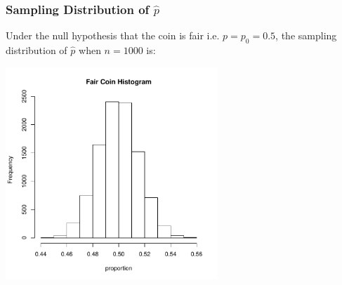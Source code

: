 \documentclass[handout]{beamer}
\newcommand{\blue}[1]{\textcolor{blue2}{#1}}
\begin{document}
\begin{frame}
\frametitle{Sampling Distribution of $\widehat{p}$}
\blue{Under the null hypothesis that the coin is fair} i.e. $p=p_0=0.5$, the sampling distribution of $\widehat{p}$ when $n=1000$ is:

\begin{center}
\includegraphics[width=0.6\textwidth]{figure/hist1}
\end{center}
\end{frame}


%
%
%
%
%
%
%
%
\end{document}
